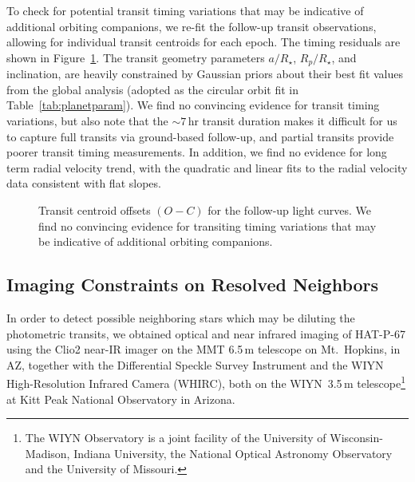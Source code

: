 \documentclass[apjl]{emulateapj}
\begin{document}
To check for potential transit timing variations that may be indicative of additional orbiting companions, we re-fit the follow-up transit observations, allowing for individual transit centroids for each epoch. The timing residuals are shown in Figure~\ref{fig:ttv}. The transit geometry parameters $a/R_\star$, $R_p/R_\star$, and inclination, are heavily constrained by Gaussian priors about their best fit values from the global analysis (adopted as the circular orbit fit in Table~\ref{tab:planetparam}). We find no convincing evidence for transit timing variations, but also note that the $\sim 7$\,hr transit duration makes it difficult for us to capture full transits via ground-based follow-up, and partial transits provide poorer transit timing measurements. In addition, we find no evidence for long term radial velocity trend, with the quadratic and linear fits to the radial velocity data consistent with flat slopes. 

\begin{figure}[!ht]
\caption{
Transit centroid offsets $(O-C)$ for the follow-up light curves. We find no convincing evidence for transiting timing variations that may be indicative of additional orbiting companions. 
\label{fig:ttv}}
\end{figure}







\subsection{Imaging Constraints on Resolved Neighbors}
\label{sec:image}
\begin{comment}
\end{comment}

In order to detect possible neighboring stars which may be diluting
the photometric transits, we obtained optical and near infrared imaging of HAT-P-67 using the Clio2 near-IR imager \citep{freed:2004} on the MMT
6.5\,m telescope on Mt.~Hopkins, in AZ, together with the
Differential Speckle Survey Instrument
\citep[DSSI;][]{howell:2011,horch:2012,horch:2011} and the WIYN High-Resolution Infrared Camera (WHIRC), both on the WIYN~3.5\,m
telescope\footnote{The WIYN Observatory is a joint facility of the University of Wisconsin-Madison, Indiana University, the National Optical Astronomy Observatory and the University of Missouri.} at Kitt Peak National Observatory in Arizona.
\end{document}
